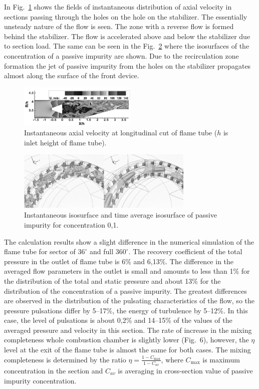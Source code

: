 \documentclass[
11pt,%
tightenlines,%
twoside,%
onecolumn,%
nofloats,%
nobibnotes,%
nofootinbib,%
superscriptaddress,%
noshowpacs,%
centertags]%
{revtex4}
\begin{document}
In Fig.~\ref{fig:p4} shows the fields of instantaneous distribution
of  axial velocity in sections passing through the holes on the hole
on the stabilizer. The essentially unsteady nature of the flow is
seen. The zone with a reverse flow is formed behind the stabilizer.
The flow is accelerated above and below the stabilizer due to
section load. The same can be seen in the Fig.~\ref{fig:p5} where
the isosurfaces of the concentration of a passive impurity are
shown. Due to the recirculation zone formation the jet of passive
impurity from the holes on the stabilizer propagates almost along
the surface of the front device.

\begin{figure}[ht]
\setcaptionmargin{5mm}
\onelinecaptionstrue
\includegraphics[width=0.5\textwidth]{pics/p4.png}
\caption{Instantaneous axial velocity
at longitudinal cut of flame tube ($h$ is inlet height of flame tube).}
\label{fig:p4}
\end{figure}

\begin{figure}[ht]
\setcaptionmargin{5mm}
\onelinecaptionstrue
\includegraphics[width=0.75\textwidth]{pics/p5.png}
\caption{Instantaneous isosurface
 and time average isosurface of passive impurity for concentration 0,1.}
\label{fig:p5}
\end{figure}

The calculation results show a slight difference in the numerical
simulation of the flame tube for sector of $36^{\circ}$ and full
$360^{\circ}$. The recovery coefficient of the total pressure in the
outlet of flame tube is 6\% and 6,13\%. The difference in the
averaged flow parameters in the outlet is small and amounts to less
than 1\% for the distribution of the total and static pressure and
about 13\% for the distribution of the concentration of a passive
impurity. The greatest differences are observed in the distribution
of the pulsating characteristics of the flow, so the pressure
pulsations differ by 5--17\%, the energy of turbulence by 5--12\%.
In this case, the level of pulsations is about 0,2\% and 14--15\% of
the values of the averaged pressure and velocity in this section.
The rate of increase in the mixing completeness whole combustion
chamber is slightly lower (Fig.~6), however, the $\eta$ level at the
exit of the flame tube is almost the same for both cases. The mixing
completeness is determined by the ratio $\eta = \frac{1 -
C_{\max}}{1 - C_{av}}$, where $C_{\max}$ is maximum concentration in
the section and $C_{av}$ is averaging in cross-section value of
passive impurity concentration.
\end{document}
